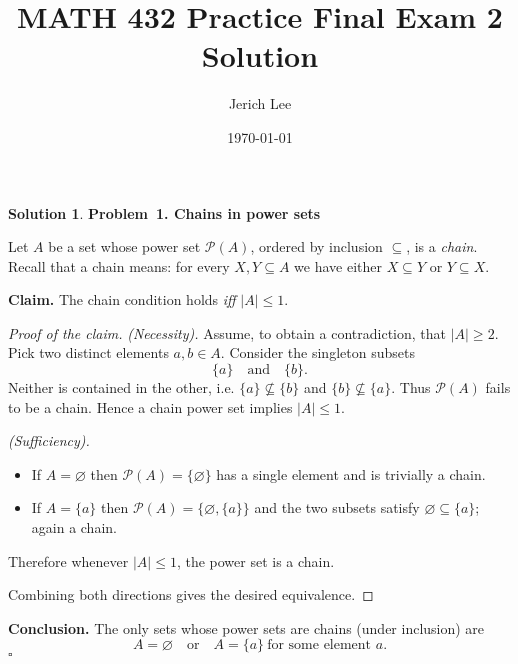 \documentclass[12pt]{article}
\title{MATH 432 Practice Final Exam 2 Solution}
\author{Jerich Lee}
\date{\today}
\theoremstyle{definition} %
\newtheorem{solution}{Solution}
\theoremstyle{plain} %
\begin{document}
\maketitle
\begin{solution}
  \textbf{Problem 1. Chains in power sets}
  
  Let \(A\) be a set whose power set \(\mathcal P(A)\), ordered by
  inclusion \(\subseteq\), is a \emph{chain}.  Recall that a chain means:
  for every \(X,Y\subseteq A\) we have either \(X\subseteq Y\) or
  \(Y\subseteq X\).
  
  \medskip
  \textbf{Claim.}  The chain condition holds \emph{iff}
  \(\lvert A\rvert\le 1\).
  
  \begin{proof}[Proof of the claim]
  \emph{(Necessity).}
  Assume, to obtain a contradiction, that \(\lvert A\rvert\ge 2\).
  Pick two distinct elements \(a,b\in A\).
  Consider the singleton subsets
  \[
     \{a\}\quad\text{and}\quad\{b\}.
  \]
  Neither is contained in the other, i.e.
  \(\{a\}\nsubseteq\{b\}\) and \(\{b\}\nsubseteq\{a\}\).
  Thus \(\mathcal P(A)\) fails to be a chain.  Hence a chain power set
  implies \(\lvert A\rvert\le 1\).
  
  \smallskip
  \emph{(Sufficiency).}
  \begin{itemize}
      \item If \(A=\varnothing\) then \(\mathcal P(A)=\{\varnothing\}\)
            has a single element and is trivially a chain.
      \item If \(A=\{a\}\) then
            \(\mathcal P(A)=\{\varnothing,\{a\}\}\) and the two subsets
            satisfy \(\varnothing\subseteq\{a\}\); again a chain.
  \end{itemize}
  Therefore whenever \(\lvert A\rvert\le 1\), the power set is a chain.
  
  \smallskip
  Combining both directions gives the desired equivalence.
  \end{proof}
  
  \medskip
  \textbf{Conclusion.}
  The only sets whose power sets are chains (under inclusion) are
  \[
     A=\varnothing
     \quad\text{or}\quad
     A=\{a\}\ \text{for some element }a.
  \]
  \(\square\)
  \end{solution}
\end{document}
